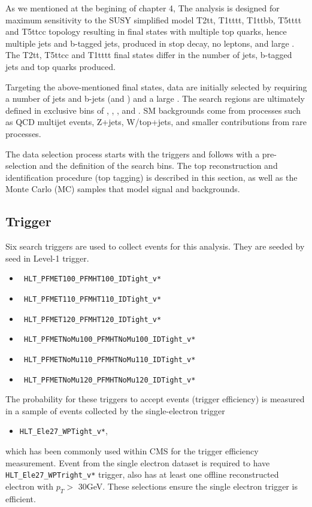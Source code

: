 As we mentioned at the begining of chapter 4, The analysis is designed for maximum sensitivity to the SUSY simplified model T2tt, T1tttt, T1ttbb, T5tttt and T5ttcc topology resulting in final states with multiple top quarks, hence multiple jets and b-tagged jets, produced in stop decay, no leptons, and large \MET. The T2tt, T5ttcc and T1tttt final states differ in the number of jets, b-tagged jets and top quarks produced. 

Targeting the above-mentioned final states, data are initially selected by requiring a number of jets and b-jets (\njets and \nbjets) and a large \MET. The search regions are ultimately defined in exclusive bins of \ntops, \nbjets, \HT, \MET and \MTTwo. SM backgrounds come from processes such as \ttbar QCD multijet events, Z+jets, W/top+jets, and smaller contributions from rare processes.

The data selection process starts with the triggers and follows with a pre-selection and the definition of the search bins. The top reconstruction and identification procedure (top tagging) is described in this section, as well as the Monte Carlo (MC) samples that model signal and backgrounds.

\subsection{Trigger}
\label{sec:trig}
Six search triggers are used to collect events for this analysis. They are seeded by \MET seed in Level-1 trigger. 
\begin{itemize}
\item \texttt{ HLT\_PFMET100\_PFMHT100\_IDTight\_v*}
\item \texttt{ HLT\_PFMET110\_PFMHT110\_IDTight\_v*}
\item \texttt{ HLT\_PFMET120\_PFMHT120\_IDTight\_v*}
\item \texttt{ HLT\_PFMETNoMu100\_PFMHTNoMu100\_IDTight\_v*} 
\item \texttt{ HLT\_PFMETNoMu110\_PFMHTNoMu110\_IDTight\_v* }
\item \texttt{ HLT\_PFMETNoMu120\_PFMHTNoMu120\_IDTight\_v*}
\end{itemize}

The probability for these triggers to accept events (trigger efficiency) is
measured in a sample of events collected by the single-electron trigger
\begin{itemize}
  \item \texttt{HLT\_Ele27\_WPTight\_v*},
\end{itemize}
which has been commonly used within CMS for the \MET trigger efficiency measurement. 
Event from the single electron dataset is required to have
\texttt{HLT\_Ele27\_WPTright\_v*} trigger, also has at least one offline
reconstructed electron with $p_{T}>$ 30GeV. These selections ensure the single
electron trigger is efficient. 


